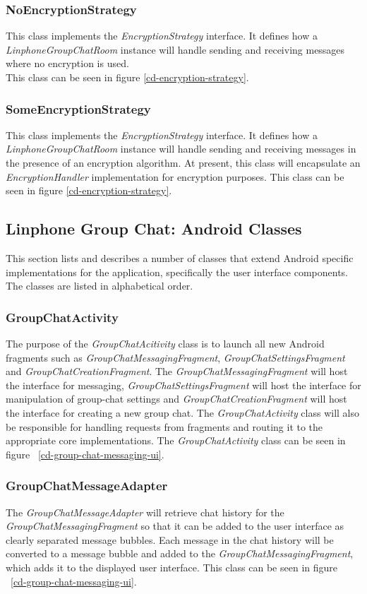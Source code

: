 \documentclass[11pt]{article}
\begin{document}
\subsubsection{NoEncryptionStrategy}
This class implements the \textit{EncryptionStrategy} interface. It defines how a \textit{LinphoneGroupChatRoom} instance will handle sending and receiving messages where no encryption is used. \\
This class can be seen in figure \ref{cd-encryption-strategy}.
\subsubsection{SomeEncryptionStrategy}
This class implements the \textit{EncryptionStrategy} interface. It defines how a \textit{LinphoneGroupChatRoom} instance will handle sending and receiving messages in the presence of an encryption algorithm. At present, this class will encapsulate an \textit{EncryptionHandler} implementation for encryption purposes.
This class can be seen in figure \ref{cd-encryption-strategy}.

\subsection{Linphone Group Chat: Android Classes}
This section lists and describes a number of classes that extend Android specific implementations for the application, specifically the user interface components. The classes are listed in alphabetical order.
\subsubsection{GroupChatActivity}\label{subsubsec: groupchatactivity}
The purpose of the \textit{GroupChatAcitivity} class is to launch all new Android fragments such as \textit{GroupChatMessagingFragment}, \textit{GroupChatSettingsFragment} and \textit{GroupChatCreationFragment}. The \textit{GroupChatMessagingFragment} will host the interface for messaging, \textit{GroupChatSettingsFragment} will host the interface for manipulation of group-chat settings and \textit{GroupChatCreationFragment} will host the interface for creating a new group chat. The \textit{GroupChatActivity} class will also be responsible for handling requests from fragments and routing it to the appropriate core implementations. The \textit{GroupChatActivity} class can be seen in figure ~\ref{cd-group-chat-messaging-ui}.
\subsubsection{GroupChatMessageAdapter}
The \textit{GroupChatMessageAdapter} will retrieve chat history for the \textit{GroupChatMessagingFragment} so that it can be added to the user interface as clearly separated message bubbles. Each message in the chat history will be converted to a message bubble and added to the \textit{GroupChatMessagingFragment}, which adds it to the displayed user interface. This class can be seen in figure ~\ref{cd-group-chat-messaging-ui}.
\end{document}
